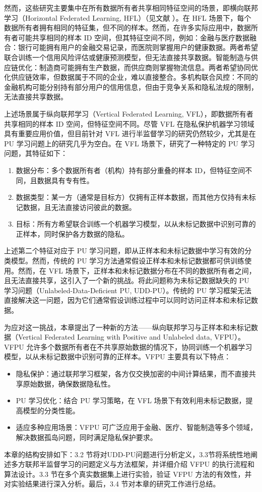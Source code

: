 然而，这些研究主要集中在所有数据所有者共享相同特征空间的场景，即横向联邦学习（Horizontal Federated Learning, HFL）（见文献 \textsuperscript{\cite{yang2019federated}}）。在 HFL 场景下，每个数据所有者拥有相同的特征集，但不同的样本。然而，在许多实际应用中，数据所有者可能共享相同的样本 ID 空间，但其特征空间不同，例如：金融与医疗数据融合：银行可能拥有用户的金融交易记录，而医院则掌握用户的健康数据。两者希望联合训练一个信用风险评估或健康预测模型，但无法直接共享数据。智能制造与供应链优化：制造商可能拥有生产数据，而供应商则掌握物流信息。两者希望协同优化供应链效率，但数据属于不同的企业，难以直接整合。多机构联合风控：不同的金融机构可能分别持有部分用户的信用信息，但由于竞争关系和隐私法规的限制，无法直接共享数据。

上述场景属于纵向联邦学习（Vertical Federated Learning, VFL）\textsuperscript{\cite{yang2019federated}}，即数据所有者共享相同的样本 ID 空间，但特征空间不同。尽管 VFL 在隐私保护机器学习领域具有重要应用价值，但目前针对 VFL 进行半监督学习的研究仍然较少，尤其是在 PU 学习问题上的研究几乎为空白。在 VFL 场景下，研究了一种特定的 PU 学习问题，其特征如下：
\begin{enumerate}
	\item 数据分布：多个数据所有者（机构）持有部分重叠的样本 ID，但特征空间不同，且数据具有专有性。
	\item 数据类型：某一方（通常是目标方）仅拥有正样本数据，而其他方仅持有未标记数据，且无法直接访问彼此的数据。
	\item 目标：所有方希望联合训练一个机器学习模型，以从未标记数据中识别可靠的正样本，同时保护各方数据的隐私。
\end{enumerate}
上述第二个特征对应于 PU 学习问题，即从正样本和未标记数据中学习有效的分类模型。然而，传统的 PU 学习方法\textsuperscript{\cite{mordelet2014bagging, liu2003building, liu2015classification, xu2017multi}}通常假设正样本和未标记数据都可供训练使用。然而，在 VFL 场景下，正样本和未标记数据分布在不同的数据所有者之间，且无法直接共享，这引入了一个新的挑战。将此问题称为未标记数据缺失的 PU 学习问题（Unlabeled-Data-Deficient PU, UDD-PU）。传统的 PU 学习框架无法直接解决这一问题，因为它们通常假设训练过程中可以同时访问正样本和未标记数据。

为应对这一挑战，本章提出了一种新的方法——纵向联邦学习与正样本和未标记数据（Vertical Federated Learning with Positive and Unlabeled data, VFPU）。VFPU 允许多个数据所有者在不共享原始数据的情况下，协同训练一个机器学习模型，以从未标记数据中识别可靠的正样本。VFPU 主要具有以下特点：
\begin{itemize}
	\item 隐私保护：通过联邦学习框架，各方仅交换加密的中间计算结果，而不直接共享原始数据，确保数据隐私性。
	\item PU 学习优化：结合 PU 学习策略，在 VFL 场景下有效利用未标记数据，提高模型的分类性能。
	\item 适应多种应用场景：VFPU 可广泛应用于金融、医疗、智能制造等多个领域，解决数据孤岛问题，同时满足隐私保护要求。
\end{itemize}
本章的结构安排如下：3.2 节将对UDD-PU问题进行分析定义，3.3节将系统性地阐述多方联邦半监督学习的问题定义与方法框架，并详细介绍 VFPU 的执行流程和算法设计。3.3 节在多个真实数据集上进行实验，验证 VFPU 方法的有效性，并对实验结果进行深入分析。最后，3.4 节对本章的研究工作进行总结。



